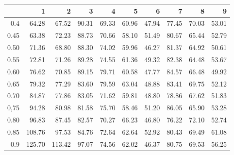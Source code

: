 \begin{table}[ht]
\centering
\begin{tabular}{rrrrrrrrrr}
  \hline
 & 1 & 2 & 3 & 4 & 5 & 6 & 7 & 8 & 9 \\ 
  \hline
0.4 & 64.28 & 67.52 & 90.31 & 69.33 & 60.96 & 47.94 & 77.45 & 70.03 & 53.01 \\ 
  0.45 & 63.38 & 72.23 & 88.73 & 70.66 & 58.10 & 51.49 & 80.67 & 65.44 & 52.79 \\ 
  0.50 & 71.36 & 68.80 & 88.30 & 74.02 & 59.96 & 46.27 & 81.37 & 64.92 & 50.61 \\ 
  0.55 & 72.81 & 71.26 & 89.28 & 74.55 & 61.36 & 49.32 & 82.38 & 64.48 & 53.67 \\ 
  0.60 & 76.62 & 70.85 & 89.15 & 79.71 & 60.58 & 47.77 & 84.57 & 66.48 & 49.92 \\ 
  0.65 & 79.32 & 77.29 & 83.60 & 79.59 & 63.04 & 48.88 & 83.41 & 69.75 & 52.12 \\ 
  0.70 & 84.87 & 77.86 & 83.05 & 71.62 & 59.81 & 48.80 & 78.86 & 67.62 & 51.83 \\ 
  0,75 & 94.28 & 80.98 & 81.58 & 75.70 & 58.46 & 51.20 & 86.05 & 65.90 & 53.28 \\ 
  0.80 & 96.83 & 87.45 & 82.57 & 70.27 & 66.23 & 46.80 & 76.22 & 72.10 & 52.74 \\ 
  0.85 & 108.76 & 97.53 & 84.76 & 72.64 & 62.64 & 52.92 & 80.43 & 69.49 & 61.08 \\ 
  0.9 & 125.70 & 113.42 & 97.07 & 74.56 & 62.02 & 46.37 & 80.75 & 69.53 & 56.25 \\ 
   \hline
\end{tabular}
\end{table}
